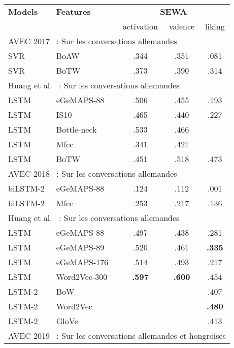 \begin{table}[]
    \centering
    \begin{tabular}{| l | l | c | c | c |}
        \hline
        \textbf{Models} &\textbf{Features} &\multicolumn{3}{c|}{\textbf{SEWA}} \\ \cline{3-5}
        & &activation &valence &liking \\
        \hline
        \multicolumn{5}{|l|}{AVEC 2017~\cite{AVEC2017} : Sur les conversations allemandes} \\
        \hline
        SVR      &BoAW~\cite{Schmitt2016} &.344  &.351 &.081 \\
        SVR      &BoTW                    &.373  &.390 &.314 \\
       \hline
       \multicolumn{5}{|l|}{Huang et al.~\cite{Huang2017} : Sur les conversations allemandes} \\
       \hline
       LSTM     &eGeMAPS-88  &.506  &.455 &.193 \\
       LSTM     &IS10        &.465  &.440 &.227 \\
       LSTM     &Bottle-neck~\cite{Fer2015} &.533  &.466 &     \\
       LSTM     &Mfcc        &.341  &.421 &     \\
       LSTM     &BoTW        &.451  &.518 &.473 \\
        \hline
        \multicolumn{5}{|l|}{AVEC 2018~\cite{AVEC2018} : Sur les conversations allemandes} \\
        \hline
        biLSTM-2 &eGeMAPS-88  &.124  &.112 &.001 \\
        biLSTM-2 &Mfcc        &.253  &.217 &.136 \\
         \hline
       \multicolumn{5}{|l|}{Huang et al.~\cite{Huang2018} : Sur les conversations allemandes} \\
       \hline
       LSTM     &eGeMAPS-88   &.497  &.438 &.281 \\
       LSTM     &eGeMAPS-89   &.520  &.461 &\textbf{.335} \\
       LSTM     &eGeMAPS-176  &.514  &.493 &.217 \\
       LSTM       &Word2Vec-300   &\textbf{.597}  &\textbf{.600} &.454 \\
       LSTM-2     &BoW            &  & &.407 \\
       LSTM-2     &Word2Vec       &  & &\textbf{.480} \\
       LSTM-2     &GloVe          &  & &.413 \\
        \hline
        \multicolumn{5}{|l|}{AVEC 2019~\cite{AVEC2019} : Sur les conversations allemandes et hongroises} \\

\end{tabular}
\end{table}
